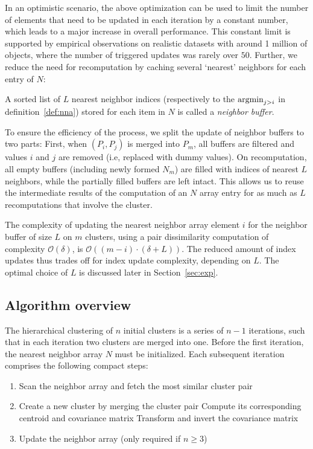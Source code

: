 In an optimistic scenario, the above optimization can be used to limit the number of elements that need to be updated in each iteration by a constant number, which leads to a major increase in overall performance.
This constant limit is supported by empirical observations on realistic datasets with around 1 million of objects, where the number of triggered updates was rarely over $50$.
Further, we reduce the need for recomputation by caching several `nearest' neighbors for each entry of $N$:

\begin{defn}
A sorted list of $L$ nearest neighbor indices (respectively to the $\operatorname{argmin}_{j>i}$ in definition~\ref{def:nna}) stored for each item in $N$ is called a \emph{neighbor buffer}.
\end{defn}

To ensure the efficiency of the process, we split the update of neighbor buffers to two parts:
First, when $(P_i,P_j)$ is merged into $P_m$, all buffers are filtered and values $i$ and $j$ are removed (i.e, replaced with dummy values).
On recomputation, all empty buffers (including newly formed $N_m$) are filled with indices of nearest $L$ neighbors, while the partially filled buffers are left intact.
This allows us to reuse the intermediate results of the computation of an $N$ array entry for as much as $L$ recomputations that involve the cluster.

The complexity of updating the nearest neighbor array element $i$ for the neighbor buffer of size $L$ on $m$ clusters, using a pair dissimilarity computation of complexity $\mathcal{O}(\delta)$, is $\mathcal{O}((m-i)\cdot (\delta+L))$.
The reduced amount of index updates thus trades off for index update complexity, depending on $L$.
The optimal choice of $L$ is discussed later in Section~\ref{sec:exp}.

\subsection{Algorithm overview}

The hierarchical clustering of $n$ initial clusters is a series of $n-1$ iterations, such that in each iteration two clusters are merged into one. Before the first iteration, the nearest neighbor array $N$ must be initialized.
Each subsequent iteration comprises the following compact steps:
\begin{enumerate}
	\item Scan the neighbor array and fetch the most similar cluster pair
	\item Create a new cluster by merging the cluster pair
	      \subitem Compute its corresponding centroid and covariance matrix
	      \subitem Transform and invert the covariance matrix
	\item Update the neighbor array (only required if $n\geq 3$)
\end{enumerate}

